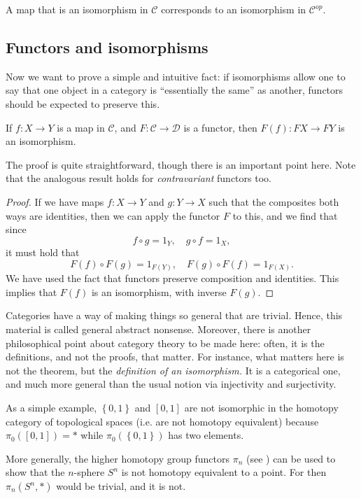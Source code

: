 \begin{exercise} 
A map that is an isomorphism in $\mathcal{C}$ corresponds to an isomorphism in
$\mathcal{C}^{op}$.
\end{exercise} 
\subsection{Functors and isomorphisms}
Now we want to prove a simple and intuitive fact: if isomorphisms allow one to
say that one object in a category is ``essentially the same'' as another,
functors should be expected to preserve this.
\begin{proposition}
If $f: X \to Y$ is a map in $\mathcal{C}$, and $F: \mathcal{C} \to \mathcal{D}$
is a functor, then $F(f): FX \to FY$ is an isomorphism.
\end{proposition}

The proof is quite straightforward, though there is an important point here.
Note that the analogous result holds for \emph{contravariant} functors too.

\begin{proof}
If we have maps $f: X \to Y$ and $g : Y \to X$ such that the composites both
ways are identities, then we can apply the functor $F$ to this, and we find
that since
\[ f \circ g = 1_Y, \quad g \circ f = 1_X,   \]
it must hold that
\[ F(f) \circ F(g) = 1_{F(Y)}, \quad F(g) \circ F(f) = 1_{F(X)}.  \]
We have used the fact that functors preserve composition and identities. This
implies that $F(f)$ is an isomorphism, with inverse $F(g)$.
\end{proof}

Categories have a way of making things so general that are trivial. Hence,
this material is called general abstract nonsense.
Moreover, there is another philosophical point about category theory to
be made here: often, it is the definitions, and not the proofs, that matter.
For instance, what matters here is not the theorem, but the \emph{definition of
an
isomorphism.} It is a categorical one, and much more general than the usual
notion via injectivity and surjectivity.


\begin{example} 
As a simple example, $\left\{0,1\right\}$ and $[0,1]$ are not isomorphic in the
homotopy category of topological spaces (i.e. are not homotopy equivalent)
because $\pi_0([0,1]) = \ast$ while $\pi_0(\left\{0,1\right\}) $ has two
elements.
\end{example} 

\begin{example} 
More generally, the higher homotopy group functors  $\pi_n$ (see \cite{Ha02}) can be used to show
that the $n$-sphere $S^n$ is not homotopy equivalent to a point. For then
$\pi_n(S^n, \ast)$ would be trivial, and it is not.
\end{example} 


